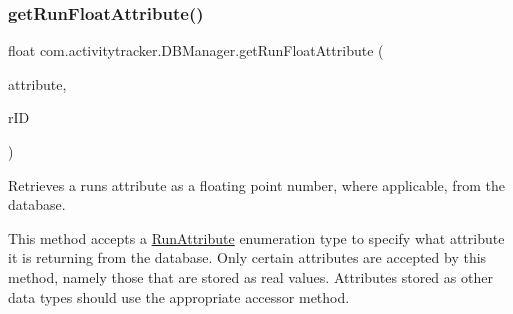 \subsubsection{\texorpdfstring{getRunFloatAttribute()}{getRunFloatAttribute()}}
{\footnotesize\ttfamily float com.\+activitytracker.\+D\+B\+Manager.\+get\+Run\+Float\+Attribute (\begin{DoxyParamCaption}\item[{final \mbox{\hyperlink{enumcom_1_1activitytracker_1_1_run_attribute}{Run\+Attribute}}}]{attribute,  }\item[{final int}]{r\+ID }\end{DoxyParamCaption})}

Retrieves a run\textquotesingle{}s attribute as a floating point number, where applicable, from the database.

This method accepts a \mbox{\hyperlink{enumcom_1_1activitytracker_1_1_run_attribute}{Run\+Attribute}} enumeration type to specify what attribute it is returning from the database. Only certain attributes are accepted by this method, namely those that are stored as real values. Attributes stored as other data types should use the appropriate accessor method.


